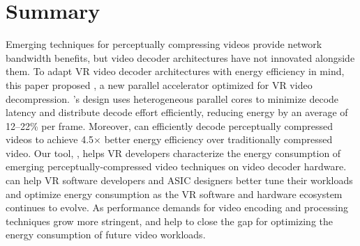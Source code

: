 \section{Summary}
Emerging techniques for perceptually compressing videos provide network bandwidth benefits, but video decoder architectures have not innovated alongside them.
To adapt VR video decoder architectures with energy efficiency in mind, this paper proposed \nameArch, a new parallel accelerator optimized for VR video decompression.
\nameArch's design uses heterogeneous parallel cores to minimize decode latency and distribute decode effort efficiently, reducing energy by an average of 12--22\% per frame.
Moreover, \nameArch can efficiently decode perceptually compressed videos to achieve 4.5$\times$ better energy efficiency over traditionally compressed video.
Our tool, \nameArchprof, helps VR developers characterize the energy consumption of emerging perceptually-compressed video techniques on video decoder hardware.
\nameArchprof can help VR software developers and ASIC designers better tune their workloads and optimize energy consumption as the VR software and hardware ecosystem continues to evolve.
As performance demands for video encoding and processing techniques grow more stringent, \nameArch and \nameArchprof help to close the gap for optimizing the energy consumption of future video workloads.
